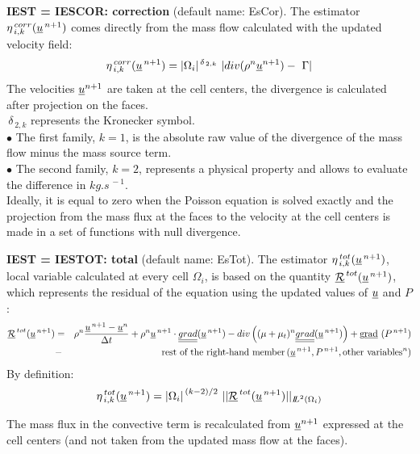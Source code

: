 {\bf IEST = IESCOR: correction}  (default name: EsCor).
The estimator $ \eta^{\,corr}_{\,i,k}(\underline{u}^{\,n+1})$ comes directly
from the mass flow calculated with the updated velocity field:
\begin{eqnarray*}
            \eta^{\,corr}_{\,i,k}(\underline{u}^{\,n+1})=
|\Omega_i|^{\,\delta_{\,2,k}}\ |div (\rho^n \underline{u}^{n+1}) -\ \Gamma|
\end{eqnarray*}
The velocities $\underline{u}^{n+1}$ are taken at the cell centers,
the divergence is calculated after projection on the faces.\\
            $ \,\delta_{\,2,k}$ represents the Kronecker symbol.\\
\hspace*{0.5cm}$\bullet$ The first family, $k=1$, is the absolute raw
value of the divergence of the mass flow minus the mass source term.\\
\hspace*{0.5cm}$\bullet$ The second family, $k=2$, represents a physical
property and allows to evaluate the difference in $kg.s^{\,-1}$.\\
Ideally, it is equal to zero when the Poisson equation is solved exactly and
the projection from the mass flux at the faces to the velocity at the cell
centers is made in a set of  functions with null divergence.

{\bf IEST = IESTOT: total} (default name: EsTot).
The estimator $ \eta^{\,tot}_{\,i,k}(\underline{u}^{\,n+1})$, local variable
calculated at every cell $\Omega_i$, is based on the quantity
$\underline{\mathcal R}^{\,tot}(\underline{u}^{\,n+1})$, which represents the
residual of the equation using the updated values of
$\underline{u}$ and $P$:
\begin{eqnarray*}
\underline{\mathcal R}^{\,tot}(\underline{u}^{\,n+1})&= & \rho^n \frac{\underline{u}^{\,n+1}-\underline{u}^n}{\Delta t}
              + \rho^n \underline{u}^{\,n+1} \cdot \underline{\underline{grad}}(\underline{u}^{\,n+1})
              - div \left((\mu+\mu_t)^n \underline{\underline{grad}}(\underline{u}^{\,n+1}) \right)
              + \text{g}\underline{\text{rad}}\ (P^{\,n+1})     \\
              &- &\text{rest of the right-hand member}
                        \,(\underline{u}^{\,n+1}, P^{\,n+1}, \text{other variables}^n)
\end{eqnarray*}
By definition:
$$ \eta^{\,tot}_{\,i,k}(\underline{u}^{\,n+1})= {|\Omega_i|}^{\,(k-2)/2}\ ||\underline{\mathcal R}^{\,tot}(\underline{u}^{\,n+1})||
_{{I\hspace{-.25em}L}^{2}(\Omega_i)}$$

The mass flux in the convective term is recalculated from $\underline{u}^{n+1}$
expressed at the cell centers (and not taken from the updated mass flow at the
faces).\\

